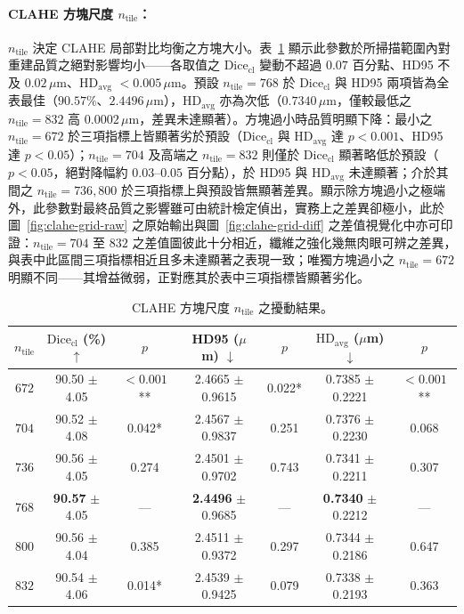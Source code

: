 \paragraph{CLAHE 方塊尺度 $n_{\text{tile}}$：} $n_{\text{tile}}$ 決定 CLAHE 局部對比均衡之方塊大小。表~\ref{tab:param-grid} 顯示此參數於所掃描範圍內對重建品質之絕對影響均小——各取值之 $\text{Dice}_{\text{cl}}$ 變動不超過 $0.07$ 百分點、HD95 不及 $0.02\,\mu\text{m}$、$\text{HD}_{\text{avg}}$ $< 0.005\,\mu\text{m}$。預設 $n_{\text{tile}} = 768$ 於 $\text{Dice}_{\text{cl}}$ 與 HD95 兩項皆為全表最佳（$90.57\%$、$2.4496\,\mu\text{m}$），$\text{HD}_{\text{avg}}$ 亦為次低（$0.7340\,\mu\text{m}$，僅較最低之 $n_{\text{tile}} = 832$ 高 $0.0002\,\mu\text{m}$，差異未達顯著）。方塊過小時品質明顯下降：最小之 $n_{\text{tile}} = 672$ 於三項指標上皆顯著劣於預設（$\text{Dice}_{\text{cl}}$ 與 $\text{HD}_{\text{avg}}$ 達 $p < 0.001$、HD95 達 $p < 0.05$）；$n_{\text{tile}} = 704$ 及高端之 $n_{\text{tile}} = 832$ 則僅於 $\text{Dice}_{\text{cl}}$ 顯著略低於預設（$p < 0.05$，絕對降幅約 $0.03$--$0.05$ 百分點），於 HD95 與 $\text{HD}_{\text{avg}}$ 未達顯著；介於其間之 $n_{\text{tile}} = 736, 800$ 於三項指標上與預設皆無顯著差異。顯示除方塊過小之極端外，此參數對最終品質之影響雖可由統計檢定偵出，實務上之差異卻極小，此於圖~\ref{fig:clahe-grid-raw} 之原始輸出與圖~\ref{fig:clahe-grid-diff} 之差值視覺化中亦可印證：$n_{\text{tile}} = 704$ 至 $832$ 之差值圖彼此十分相近，纖維之強化幾無肉眼可辨之差異，與表中此區間三項指標相近且多未達顯著之表現一致；唯獨方塊過小之 $n_{\text{tile}} = 672$ 明顯不同——其增益微弱，正對應其於表中三項指標皆顯著劣化。

\begin{table}[htbp]
  \centering
  \caption{CLAHE 方塊尺度 $n_{\text{tile}}$ 之擾動結果。}
  \label{tab:param-grid}
  \small
  \setlength{\tabcolsep}{4pt}
  \begin{tabular}{ccccccc}
    \toprule
    $n_{\text{tile}}$ & $\text{Dice}_{\text{cl}}$ (\%) $\uparrow$ & $p$ & HD95 ($\mu$m) $\downarrow$ & $p$ & $\text{HD}_{\text{avg}}$ ($\mu$m) $\downarrow$ & $p$ \\
    \midrule
    $672$ & 90.50 $\pm$ 4.05 & $<\!0.001$** & 2.4665 $\pm$ 0.9615 & 0.022* & 0.7385 $\pm$ 0.2221 & $<\!0.001$** \\
    $704$ & 90.52 $\pm$ 4.08 & 0.042* & 2.4567 $\pm$ 0.9837 & 0.251 & 0.7376 $\pm$ 0.2230 & 0.068 \\
    $736$ & 90.56 $\pm$ 4.05 & 0.274 & 2.4501 $\pm$ 0.9702 & 0.743 & 0.7341 $\pm$ 0.2211 & 0.307 \\
    \textbf{$768$} & \textbf{90.57} $\pm$ 4.05 & --- & \textbf{2.4496} $\pm$ 0.9685 & --- & \textbf{0.7340} $\pm$ 0.2212 & --- \\
    $800$ & 90.56 $\pm$ 4.04 & 0.385 & 2.4511 $\pm$ 0.9372 & 0.297 & 0.7344 $\pm$ 0.2186 & 0.647 \\
    $832$ & 90.54 $\pm$ 4.06 & 0.014* & 2.4539 $\pm$ 0.9425 & 0.079 & 0.7338 $\pm$ 0.2193 & 0.363 \\
    \bottomrule
  \end{tabular}
\end{table}

